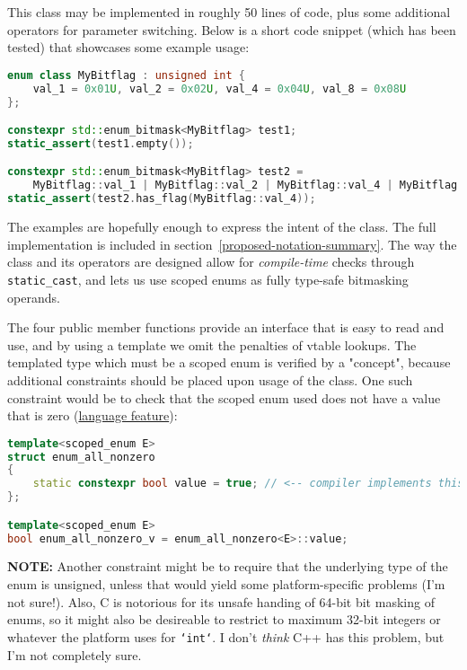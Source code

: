 \documentclass[
  format=manuscript,
  screen=true,
  review=false,
  nonacm=true,
  timestamp=true,
  balance=false]{acmart}
\newcommand{\beforecodespace}{\vspace{4mm}}
\begin{document}
This class may be implemented in roughly 50 lines of code, plus some additional
operators for parameter switching. Below is a short code snippet (which has been
tested) that showcases some example usage:

\beforecodespace\begin{lstlisting}[language=Cpp]
enum class MyBitflag : unsigned int {
    val_1 = 0x01U, val_2 = 0x02U, val_4 = 0x04U, val_8 = 0x08U
};

constexpr std::enum_bitmask<MyBitflag> test1;
static_assert(test1.empty());

constexpr std::enum_bitmask<MyBitflag> test2 =
    MyBitflag::val_1 | MyBitflag::val_2 | MyBitflag::val_4 | MyBitflag::val_8;
static_assert(test2.has_flag(MyBitflag::val_4));
\end{lstlisting}


\noindent
The examples are hopefully enough to express the intent of the class.
The full implementation is included in section~\ref{proposed-notation-summary}.
The way the class and its operators are designed allow for \textit{compile-time}
checks through \texttt{static\_cast}, and lets us use scoped enums as fully type-safe
bitmasking operands.

The four public member functions
provide an interface that is easy to read and use, and by using a template we omit
the penalties of vtable lookups. The templated type which must be a scoped enum is
verified by a "concept", because additional constraints should be placed upon usage
of the class. One such constraint would be to check that the scoped enum used does
not have a value that is zero (\underline{language feature}):

\beforecodespace\begin{lstlisting}[language=Cpp]
template<scoped_enum E>
struct enum_all_nonzero
{
    static constexpr bool value = true; // <-- compiler implements this
};

template<scoped_enum E>
bool enum_all_nonzero_v = enum_all_nonzero<E>::value;
\end{lstlisting}

\noindent
\textbf{NOTE:} Another constraint might be to require that the underlying type
of the enum is unsigned, unless that would yield some platform-specific
problems (I'm not sure!). Also, C is notorious for its unsafe handing of 64-bit
bit masking of enums, so it might also be desireable to restrict to maximum
32-bit integers or whatever the platform uses for \texttt{`int`}. I don't
\textit{think} C++ has this problem, but I'm not completely sure.
\end{document}
